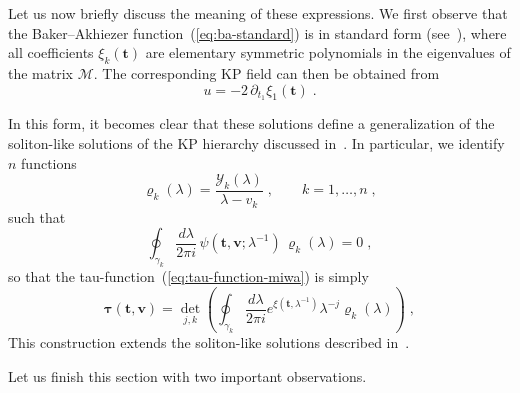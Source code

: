 \documentclass[a4paper,11pt]{amsart}
\begin{document}
Let us now briefly discuss the meaning of these expressions. We first
observe that the Baker--Akhiezer function~(\ref{eq:ba-standard}) is in
standard form (see~\cite{Zabrodin2018}), where all coefficients \(
\xi_k(\bm{t}) \) are elementary symmetric polynomials in the
eigenvalues of the matrix \( \bm{\mathcal{M}} \). The corresponding KP
field can then be obtained from
\begin{equation}
  u = -2\, \partial_{t_1} \xi_1(\bm{t})\;.
\end{equation}

In this form, it becomes clear that these solutions define a
generalization of the soliton-like solutions of the KP hierarchy
discussed in~\cite{Zabrodin2018}. In particular, we identify \( n \)
functions
\begin{equation}
  \varrho_k(\lambda) = \frac{\mathcal{Y}_k(\lambda)}{\lambda - v_k}\;, \qquad k = 1, \dots, n\;,
\end{equation}
such that
\begin{equation}
  \oint_{\gamma_k} \frac{d\lambda}{2\pi i}\, \psi(\bm{t}, \bm{v}; \lambda^{-1})\, \varrho_k(\lambda) = 0\;, 
\end{equation}
so that the tau-function~(\ref{eq:tau-function-miwa}) is simply
\begin{equation}
  \bm{\tau}(\bm{t}, \bm{v}) =
    \det_{j,k}\left(
    \oint_{\gamma_k} \frac{d \lambda}{2\pi i} e^{\xi(\bm{t}, \lambda^{-1})} \lambda^{-j}\varrho_k(\lambda) \right)\; ,
\end{equation}
This construction extends the soliton-like solutions described in~\cite{Zabrodin2018}.

Let us finish this section with two important observations. 
\end{document}
